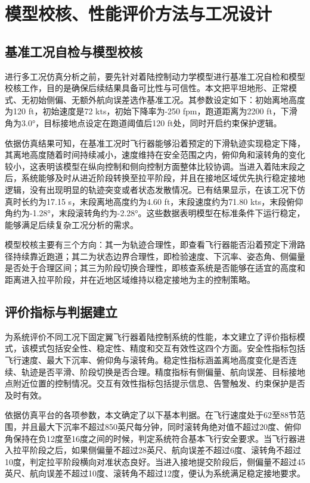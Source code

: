 \chapter{模型校核、性能评价方法与工况设计}

\section{基准工况自检与模型校核}

进行多工况仿真分析之前，要先针对着陆控制动力学模型进行基准工况自检和模型校核工作，目的是确保后续结果具备可比性与可信性。本文把平坦地形、正常模式、无初始侧偏、无额外航向误差选作基准工况。其参数设定如下：初始离地高度为120 ft，初始速度是72 kts，初始下降率为-250 fpm，跑道距离为2200 ft，下滑角为3.0°，目标接地点设定在跑道阈值后120 ft处，同时开启约束保护逻辑。

依据仿真结果可知，在基准工况时飞行器能够沿着预定的下滑轨迹实现稳定下降，其离地高度随着时间持续减小，速度维持在安全范围之内，俯仰角和滚转角的变化较小，这表明该模型在纵向控制和侧向控制方面整体比较协调。当进入着陆末段之后，系统能够及时从进近阶段转换至拉平阶段，并且在接地区域优先执行稳定接地逻辑，没有出现明显的轨迹突变或者状态发散情况。已有结果显示，在该工况下仿真时长约为17.15 s，末段离地高度约为4.60 ft，末段速度约为71.80 kts，末段俯仰角约为-1.28°，末段滚转角约为-2.28°。这些数据表明模型在标准条件下运行稳定，能够满足后续复杂工况分析的需求。

模型校核主要有三个方向：其一为轨迹合理性，即查看飞行器能否沿着预定下滑路径持续靠近跑道；其二为状态边界合理性，即检验速度、下沉率、姿态角、侧偏量是否处于合理区间；其三为阶段切换合理性，即核查系统是否能够在适宜的高度和距离进入拉平阶段，并在近地区域维持以稳定接地为主的控制策略。

\section{评价指标与判据建立}

为系统评价不同工况下固定翼飞行器着陆控制系统的性能，本文建立了评价指标模式，该模式包括安全性、稳定性、精度和交互有效性这四个方面。安全性指标包括飞行速度、最大下沉率、俯仰角与滚转角。稳定性指标涵盖离地高度变化是否连续、轨迹是否平滑、阶段切换是否合理。精度指标有侧偏量、航向误差、目标接地点附近位置的控制情况。交互有效性指标包括提示信息、告警触发、约束保护是否及时有效。

依据仿真平台的各项参数，本文确定了以下基本判据。在飞行速度处于62至88节范围，并且最大下沉率不超过850英尺每分钟，同时滚转角绝对值不超过20度、俯仰角保持在负12度至16度之间的时候，判定系统符合基本飞行安全要求。当飞行器进入拉平阶段之后，如果侧偏量不超过28英尺、航向误差不超过6度、滚转角不超过10度，判定拉平阶段横向对准状态良好。当进入接地提交阶段后，侧偏量不超过45英尺、航向误差不超过10度、滚转角不超过12度，便认为系统满足稳定接地要求。

